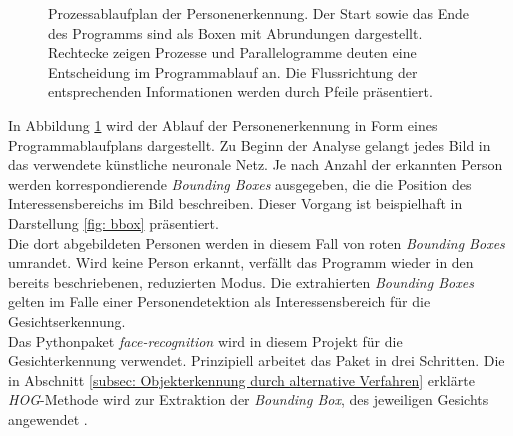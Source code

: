 \begin{figure}[H]
			\caption{Prozessablaufplan der Personenerkennung. Der Start sowie das Ende des Programms sind als Boxen mit Abrundungen dargestellt. Rechtecke zeigen Prozesse und Parallelogramme deuten eine Entscheidung im Programmablauf an. Die Flussrichtung der entsprechenden Informationen werden durch Pfeile präsentiert.}
			\label{fig: Personenerkennung}
		\end{figure}
		\newpage
	
		In Abbildung \ref{fig: Personenerkennung} wird der Ablauf der Personenerkennung in Form eines Programmablaufplans dargestellt. Zu Beginn der Analyse gelangt jedes Bild in das verwendete künstliche neuronale Netz. Je nach Anzahl der erkannten Person werden korrespondierende \textit{Bounding Boxes} ausgegeben, die die Position des Interessensbereichs im Bild beschreiben. Dieser Vorgang ist beispielhaft in Darstellung \ref{fig: bbox} präsentiert.\\
	
		Die dort abgebildeten Personen werden in diesem Fall von roten \textit{Bounding Boxes} umrandet. Wird keine Person erkannt, verfällt das Programm wieder in den bereits beschriebenen, reduzierten Modus. Die extrahierten \textit{Bounding Boxes} gelten im Falle einer Personendetektion als Interessensbereich für die Gesichtserkennung.\\
		
	Das Pythonpaket \textit{face-recognition} wird in diesem Projekt für die Gesichterkennung verwendet. Prinzipiell arbeitet das Paket in drei Schritten. Die in Abschnitt \ref{subsec: Objekterkennung durch alternative Verfahren} erklärte \textit{HOG}-Methode wird zur Extraktion der \textit{Bounding Box}, des jeweiligen Gesichts angewendet \cite{facerecarticle}.\\
	

